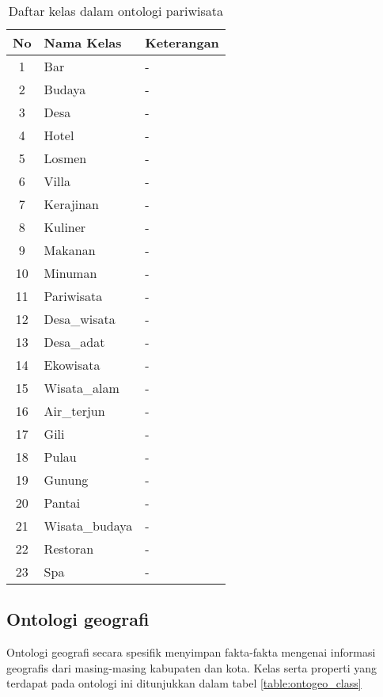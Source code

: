 \begin{table}[!]
	\caption{Daftar kelas dalam ontologi pariwisata}
	\label{table:ontopar_class}
	\begin{tabularx}{\textwidth}{|c|X|X|}
		\hline
		No & Nama Kelas & Keterangan \\
		\hline
		1 & Bar & - \\
		\hline
		2 & Budaya & - \\
		\hline
		3 & Desa & - \\
		\hline
		4 & Hotel & - \\
		\hline
		5 & Losmen & - \\
		\hline
		6 & Villa & - \\
		\hline
		7 & Kerajinan & - \\
		\hline
		8 & Kuliner & - \\
		\hline
		9 & Makanan & - \\
		\hline
		10 & Minuman & - \\
		\hline
		11 & Pariwisata & - \\
		\hline
		12 & Desa\_wisata & - \\
		\hline
		13 & Desa\_adat & - \\
		\hline
		14 & Ekowisata & - \\
		\hline
		15 & Wisata\_alam & - \\
		\hline
		16 & Air\_terjun & - \\
		\hline
		17 & Gili & - \\
		\hline
		18 & Pulau & - \\
		\hline
		19 & Gunung & - \\
		\hline
		20 & Pantai & - \\
		\hline
		21 & Wisata\_budaya & - \\
		\hline
		22 & Restoran & - \\
		\hline
		23 & Spa & - \\
		\hline
	\end{tabularx}
\end{table}

\subsection{Ontologi geografi}
Ontologi geografi secara spesifik menyimpan fakta-fakta mengenai informasi geografis dari masing-masing kabupaten dan kota. Kelas serta properti yang terdapat pada ontologi ini ditunjukkan dalam tabel \ref{table:ontogeo_class}

